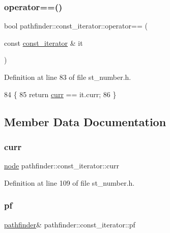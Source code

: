 \subsubsection{\texorpdfstring{operator==()}{operator==()}}
{\footnotesize\ttfamily bool pathfinder\+::const\+\_\+iterator\+::operator== (\begin{DoxyParamCaption}\item[{const \mbox{\hyperlink{classpathfinder_1_1const__iterator}{const\+\_\+iterator}} \&}]{it }\end{DoxyParamCaption})\hspace{0.3cm}{\ttfamily [inline]}}



Definition at line 83 of file st\+\_\+number.\+h.


\begin{DoxyCode}
84     \{
85         \textcolor{keywordflow}{return} \mbox{\hyperlink{classpathfinder_1_1const__iterator_a76b08ac8c5b5055b95cc37d5a14d54e4}{curr}} == it.curr;
86     \}
\end{DoxyCode}


\subsection{Member Data Documentation}
\mbox{\label{classpathfinder_1_1const__iterator_a76b08ac8c5b5055b95cc37d5a14d54e4}} 
\subsubsection{\texorpdfstring{curr}{curr}}
{\footnotesize\ttfamily \mbox{\hyperlink{classnode}{node}} pathfinder\+::const\+\_\+iterator\+::curr\hspace{0.3cm}{\ttfamily [private]}}



Definition at line 109 of file st\+\_\+number.\+h.

\mbox{\label{classpathfinder_1_1const__iterator_a913c0268881f3da2ae1b95165a21a85d}} 
\subsubsection{\texorpdfstring{pf}{pf}}
{\footnotesize\ttfamily \mbox{\hyperlink{classpathfinder}{pathfinder}}\& pathfinder\+::const\+\_\+iterator\+::pf\hspace{0.3cm}{\ttfamily [private]}}



